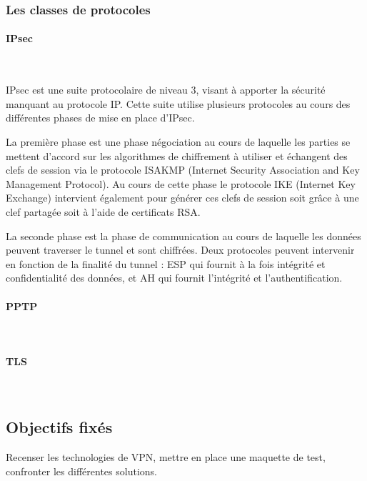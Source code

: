 \subsubsection{Les classes de protocoles}
\paragraph{IPsec}
~

IPsec est une suite protocolaire de niveau 3, visant à apporter la sécurité manquant au protocole IP. Cette suite utilise plusieurs protocoles au cours des différentes phases de mise en place d'IPsec.

La première phase est une phase négociation au cours de laquelle les parties se mettent d'accord sur les algorithmes de chiffrement à utiliser et échangent des clefs de session via le protocole ISAKMP (Internet Security Association and Key Management Protocol). Au cours de cette phase le protocole IKE (Internet Key Exchange) intervient également pour générer ces clefs de session soit grâce à une clef partagée soit à l'aide de certificats RSA.

La seconde phase est la phase de communication au cours de laquelle les données peuvent traverser le tunnel et sont chiffrées. Deux protocoles peuvent intervenir en fonction de la finalité du tunnel : ESP qui fournit à la fois intégrité et confidentialité des données, et AH qui fournit l'intégrité et l'authentification.

\paragraph{PPTP}
~

\paragraph{TLS}
~

\subsection{Objectifs fixés}
Recenser les technologies de VPN, mettre en place une maquette de test, confronter les différentes solutions.

\pagebreak
